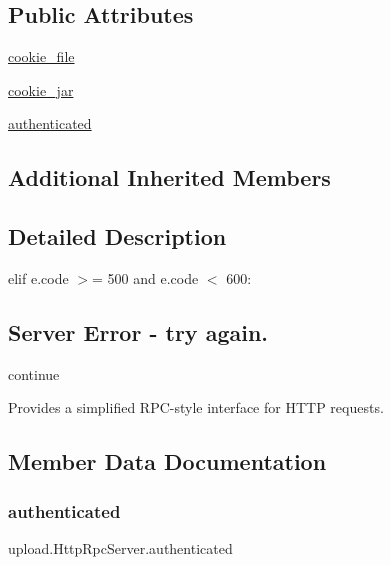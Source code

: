 \subsection*{Public Attributes}
\begin{DoxyCompactItemize}
\item 
\hyperlink{classupload_1_1_http_rpc_server_ad5c1a730c030f9d3b5f70c2e0d8b9a1d}{cookie\+\_\+file}
\item 
\hyperlink{classupload_1_1_http_rpc_server_a1b9c9af7f0a46afd84a9d524782323bf}{cookie\+\_\+jar}
\item 
\hyperlink{classupload_1_1_http_rpc_server_aaa356e2491537dd0d4bfc5b1bb0fec96}{authenticated}
\end{DoxyCompactItemize}
\subsection*{Additional Inherited Members}


\subsection{Detailed Description}
elif e.\+code $>$= 500 and e.\+code $<$ 600\+: \subsection*{Server Error -\/ try again.}

continue \begin{DoxyVerb}Provides a simplified RPC-style interface for HTTP requests.\end{DoxyVerb}
 

\subsection{Member Data Documentation}
\mbox{\label{classupload_1_1_http_rpc_server_aaa356e2491537dd0d4bfc5b1bb0fec96}} 
\subsubsection{\texorpdfstring{authenticated}{authenticated}}
{\footnotesize\ttfamily upload.\+Http\+Rpc\+Server.\+authenticated}

\mbox{\label{classupload_1_1_http_rpc_server_ad5c1a730c030f9d3b5f70c2e0d8b9a1d}} 
